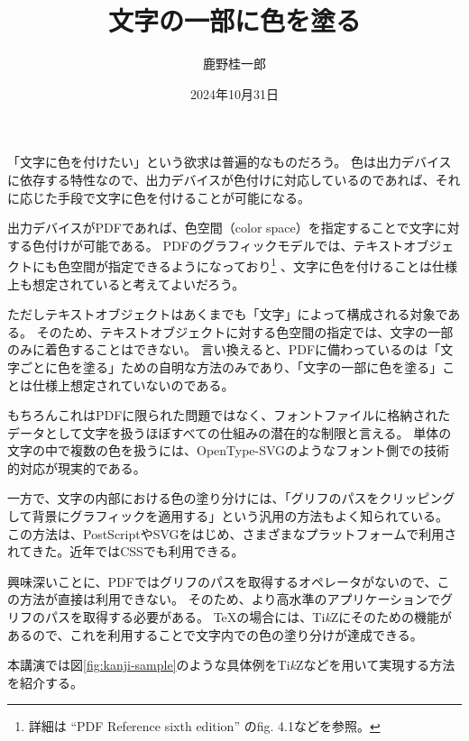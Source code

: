 \documentclass[a4paper,10pt,luatex]{jlreq}
\title{\vspace*{-3\baselineskip}文字の一部に色を塗る}
\author{鹿野桂一郎}
\date{2024年10月31日}
\newcommand{\TikZ}{Ti\textit{k}Z}
\begin{document}
\maketitle

「文字に色を付けたい」という欲求は普遍的なものだろう。
色は出力デバイスに依存する特性なので、出力デバイスが色付けに対応しているのであれば、それに応じた手段で文字に色を付けることが可能になる。

出力デバイスがPDFであれば、色空間（color space）を指定することで文字に対する色付けが可能である。
PDFのグラフィックモデルでは、テキストオブジェクトにも色空間が指定できるようになっており\footnote{詳細は ``PDF Reference sixth edition'' のfig. 4.1などを参照。}
、文字に色を付けることは仕様上も想定されていると考えてよいだろう。

ただしテキストオブジェクトはあくまでも「文字」によって構成される対象である。
そのため、テキストオブジェクトに対する色空間の指定では、文字の一部のみに着色することはできない。
言い換えると、PDFに備わっているのは「文字ごとに色を塗る」ための自明な方法のみであり、「文字の一部に色を塗る」ことは仕様上想定されていないのである。

もちろんこれはPDFに限られた問題ではなく、フォントファイルに格納されたデータとして文字を扱うほぼすべての仕組みの潜在的な制限と言える。
単体の文字の中で複数の色を扱うには、OpenType-SVGのようなフォント側での技術的対応が現実的である。

一方で、文字の内部における色の塗り分けには、「グリフのパスをクリッピングして背景にグラフィックを適用する」という汎用の方法もよく知られている。
この方法は、PostScriptやSVGをはじめ、さまざまなプラットフォームで利用されてきた。近年ではCSSでも利用できる。

興味深いことに、PDFではグリフのパスを取得するオペレータがないので、この方法が直接は利用できない。
そのため、より高水準のアプリケーションでグリフのパスを取得する必要がある。
\TeX{}の場合には、\TikZ{}にそのための機能があるので、これを利用することで文字内での色の塗り分けが達成できる。

本講演では図\ref{fig:kanji-sample}のような具体例を\TikZ{}などを用いて実現する方法を紹介する。

\vspace{\baselineskip}
\end{document}
